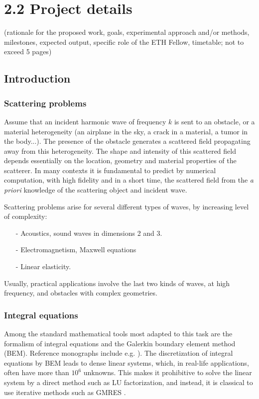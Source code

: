 \documentclass[]{article}
\begin{document}
\section*{2.2 Project details}
(rationale for the proposed work, goals, experimental approach and/or methods, milestones, expected output, specific role of the ETH Fellow, timetable; not to exceed 5 pages)

\subsection*{Introduction}


\subsubsection*{Scattering problems}	

Assume that an incident harmonic wave of frequency $k$ is sent to an obstacle, or a material heterogeneity (an airplane in the sky, a crack in a material, a tumor in the body...). The presence of the obstacle generates a scattered field propagating away from this heterogeneity. The shape and intensity of this scattered field depends essentially on the location, geometry and material properties of the scatterer. In many contexts it is fundamental to predict by numerical computation, with high fidelity and in a short time, the scattered field from the \textit{a priori} knowledge of the scattering object and incident wave. 

Scattering problems arise for several different types of waves, by increasing level of complexity:
\begin{itemize}\itemsep-.2em 
	\item[-] Acoustics, sound waves in dimensions 2 and 3.
	\item[-] Electromagnetism, Maxwell equations
	\item[-] Linear elasticity. 
\end{itemize} 
Usually, practical applications involve the last two kinds of waves, at high frequency, and obstacles with complex geometries.  

\subsubsection*{Integral equations}

Among the standard mathematical tools most adapted to this task are the formalism of integral equations and the Galerkin boundary element method (BEM). Reference monographs include e.g. \cite{mclean2000strongly,sauter2010boundary}). The discretization of integral equations by BEM leads to dense linear systems, which, in real-life applications, often have more than $10^6$ unknowns. This makes it prohibitive to solve the linear system by a direct method such as LU factorization, and instead, it is classical to use iterative methods such as GMRES \cite{saad1986gmres}.
\end{document}
